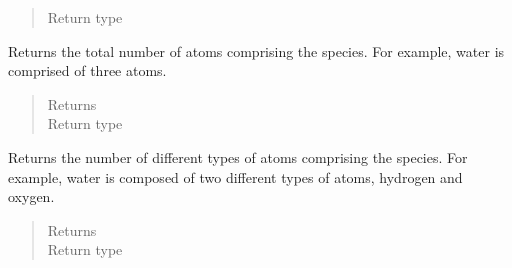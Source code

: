 \documentclass[letterpaper,10pt,openany,oneside,english]{sphinxmanual}
\begin{document}
\begin{fulllineitems}
\begin{fulllineitems}
\begin{quote}
\begin{description}
\item[{Return type}] \leavevmode
{}

\end{description}\end{quote}

\end{fulllineitems}


\begin{fulllineitems}
\label{\detokenize{support_rst/specie:specie.Specie.nAtoms}}
Returns the total number of atoms comprising the species. For example,
water is comprised of three atoms.
\begin{quote}\begin{description}
\item[{Returns}] \leavevmode
{}

\item[{Return type}] \leavevmode
{}

\end{description}\end{quote}

\end{fulllineitems}


\begin{fulllineitems}
\label{\detokenize{support_rst/specie:specie.Specie.nNuclideTypes}}
Returns the number of different types of atoms comprising the species.
For example, water is composed of two different types of atoms,
hydrogen and oxygen.
\begin{quote}\begin{description}
\item[{Returns}] \leavevmode
{}

\item[{Return type}] \leavevmode
{}

\end{description}\end{quote}

\end{fulllineitems}


\end{fulllineitems}
\end{document}
